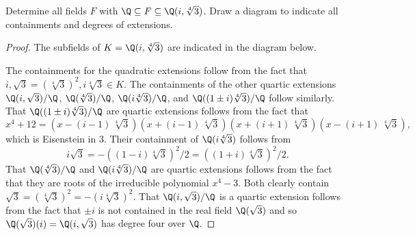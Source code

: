 \documentclass[10pt]{amsart}
\begin{document}
\begin{thm}
  Determine all fields $F$ with $\Q \subseteq F \subseteq \Q(i,\sqrt[4]{3})$.
  Draw a diagram to indicate all containments and degrees of extensions.
  \begin{proof}
    The subfields of $K = \Q(i, \sqrt[4]{3})$ are indicated in the diagram below.
    \begin{center}
    \end{center}
    The containments for the quadratic extensions follow from the fact that $i, \sqrt{3} = (\sqrt[4]{3})^2, i\sqrt[4]{3} \in K$.
    The containments of the other quartic extensions $\Q(i,\sqrt{3})/\Q$, $\Q(\sqrt[4]{3})/\Q$, $\Q(i\sqrt[4]{3})/\Q$, and $\Q((1 \pm i)\sqrt[4]{3})/\Q$ follow similarly.
    That $\Q((1 \pm i)\sqrt[4]{3})/\Q$ are quartic extensions follows from the fact that 
    $$x^4 + 12 = {\left(x - \left(i - 1\right) \, \sqrt[4]{3}\right)}
    {\left(x + \left(i - 1\right) \, \sqrt[4]{3}\right)}
    {\left(x + \left(i + 1\right) \, \sqrt[4]{3}\right)}
    {\left(x - \left(i + 1\right) \, \sqrt[4]{3}\right)},$$
    which is Eisenstein in 3.
    Their containment of $\Q(i\sqrt[4]{3})$ follows from 
    $$i\sqrt{3} = -((1-i)\sqrt[4]{3})^2/2 = ((1+i)\sqrt[4]{3})^2/2.$$
    That $\Q(\sqrt[4]{3})/\Q$ and $\Q(i\sqrt[4]{3})/\Q$ are quartic extensions follows from the fact that they are roots of the irreducible polynomial $x^4 - 3$.
    Both clearly contain $\sqrt{3} = (\sqrt[4]{3})^2 = -(i\sqrt[4]{3})^2$.
    That $\Q(i, \sqrt{3})/\Q$ is a quartic extension follows from the fact that $\pm i$ is not contained in the real field $\Q(\sqrt{3})$ and so $\Q(\sqrt{3})(i) = \Q(i,\sqrt{3})$ has degree four over $\Q$.
  \end{proof}
\end{thm}
\end{document}
